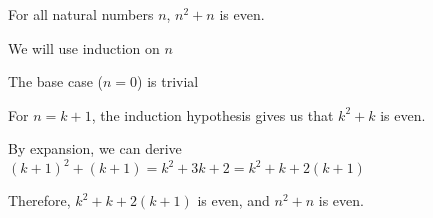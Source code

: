 
For all natural numbers $n$, $n^2+n$ is even.

We will use induction on $n$

The base case ($n=0$) is trivial

For $n=k+1$, the induction hypothesis gives us that $k^2+k$ is even.

By expansion, we can derive $(k+1)^2+(k+1) = k^2 + 3k + 2 = k^2 + k + 2(k+1)$

Therefore, $k^2+k+2(k+1)$ is even, and $n^2+n$ is even.